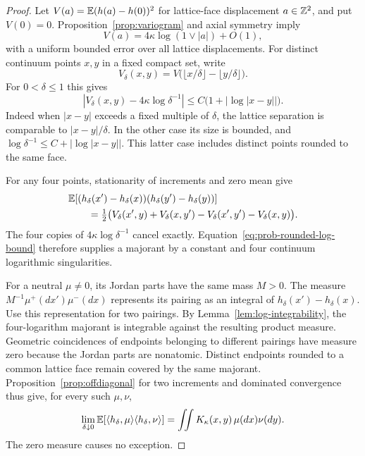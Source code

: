 \begin{proof}
Let \(V(a)=\mathbb E(h(a)-h(0))^2\) for lattice-face displacement
\(a\in\mathbb Z^2\), and put \(V(0)=0\).
Proposition~\ref{prop:variogram} and axial symmetry imply
\[
 V(a)=4\kappa\log(1\vee|a|)+O(1),
\]
with a uniform bounded error over all lattice displacements.
For distinct continuum points \(x,y\) in a fixed compact set, write
\[
 V_\delta(x,y)=
 V\bigl(\lfloor x/\delta\rfloor-\lfloor y/\delta\rfloor\bigr).
\]
For \(0<\delta\le1\) this gives
\begin{equation}\label{eq:prob-rounded-log-bound}
 \left|V_\delta(x,y)-4\kappa\log\delta^{-1}\right|
       \le C\bigl(1+|\log|x-y||\bigr).
\end{equation}
Indeed when \(|x-y|\) exceeds a fixed multiple of \(\delta\), the
lattice separation is comparable to \(|x-y|/\delta\).
In the other case its size is bounded, and
\(\log\delta^{-1}\le C+|\log|x-y||\).
This latter case includes distinct points rounded to the same face.

For any four points, stationarity of increments and zero mean give
\begin{align}\label{eq:prob-four-variograms}
 &\mathbb E[(h_\delta(x')-h_\delta(x))
            (h_\delta(y')-h_\delta(y))]\\
 &\qquad=\tfrac12\bigl(
 V_\delta(x',y)+V_\delta(x,y')
       -V_\delta(x',y')-V_\delta(x,y)\bigr).\nonumber
\end{align}
The four copies of \(4\kappa\log\delta^{-1}\) cancel exactly.
Equation~\eqref{eq:prob-rounded-log-bound} therefore supplies a majorant
by a constant and four continuum logarithmic singularities.

For a neutral \(\mu\ne0\), its Jordan parts have the same mass
\(M>0\). The measure
\(M^{-1}\mu^+(dx')\mu^-(dx)\) represents its pairing as an integral
of \(h_\delta(x')-h_\delta(x)\).
Use this representation for two pairings. By
Lemma~\ref{lem:log-integrability}, the four-logarithm majorant is
integrable against the resulting product measure. Geometric coincidences of endpoints belonging to different pairings
have measure zero because the Jordan parts are nonatomic. Distinct
endpoints rounded to a common lattice face remain covered by the same
majorant. Proposition~\ref{prop:offdiagonal} for two increments and dominated
convergence thus give, for every such \(\mu,\nu\),
\begin{equation}\label{eq:prob-energy-covariance}
 \lim_{\delta\downarrow0}
       \mathbb E[\langle h_\delta,\mu\rangle
                  \langle h_\delta,\nu\rangle]
     =\iint K_\kappa(x,y)\,\mu(dx)\nu(dy).
\end{equation}
The zero measure causes no exception.


\end{proof}
